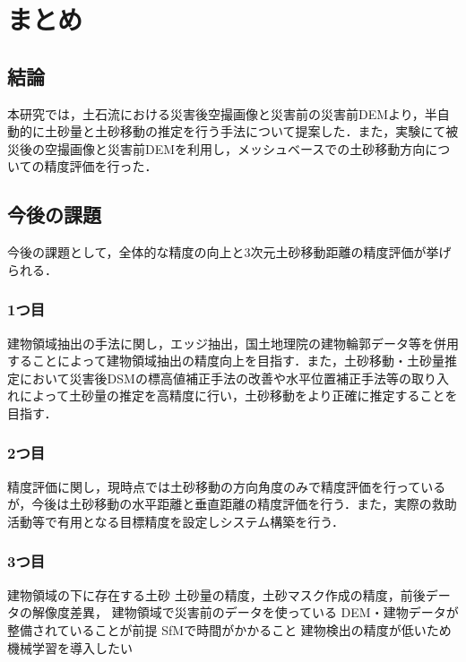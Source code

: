 \chapter{まとめ}
  \section{結論}
    本研究では，土石流における災害後空撮画像と災害前の災害前DEMより，半自動的に土砂量と土砂移動の推定を行う手法について提案した．また，実験にて被災後の空撮画像と災害前DEMを利用し，メッシュベースでの土砂移動方向についての精度評価を行った．



  \section{今後の課題}
    今後の課題として，全体的な精度の向上と3次元土砂移動距離の精度評価が挙げられる．


    \subsection{1つ目}
      建物領域抽出の手法に関し，エッジ抽出，国土地理院の建物輪郭データ等を併用することによって建物領域抽出の精度向上を目指す．また，土砂移動・土砂量推定において災害後DSMの標高値補正手法の改善や水平位置補正手法\cite{土砂量解析1}等の取り入れによって土砂量の推定を高精度に行い，土砂移動をより正確に推定することを目指す．


    \subsection{2つ目}
      精度評価に関し，現時点では土砂移動の方向角度のみで精度評価を行っているが，今後は土砂移動の水平距離と垂直距離の精度評価を行う．また，実際の救助活動等で有用となる目標精度を設定しシステム構築を行う．

      
    \subsection{3つ目}
      建物領域の下に存在する土砂
      土砂量の精度，土砂マスク作成の精度，前後データの解像度差異，
      建物領域で災害前のデータを使っている
      DEM・建物データが整備されていることが前提
      SfMで時間がかかること
      建物検出の精度が低いため機械学習を導入したい
